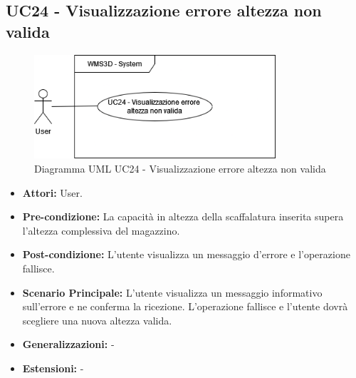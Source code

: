 \subsection{UC24 - Visualizzazione errore altezza non valida}
\begin{figure}[H]
  \centering
  \includegraphics[width=0.8\textwidth]{UC_diagrams_21-26/UC24.drawio.png}
   \caption{Diagramma UML UC24 - Visualizzazione errore altezza non valida}
\end{figure}
\begin{itemize}
    \item \textbf{Attori:} User.
    \item \textbf{Pre-condizione:}  La capacità in altezza della scaffalatura inserita supera l'altezza complessiva del magazzino.
    \item \textbf{Post-condizione:} L'utente visualizza un messaggio d'errore e l'operazione fallisce.
    \item \textbf{Scenario Principale:}  L'utente visualizza un messaggio informativo sull'errore e ne conferma la ricezione. L'operazione fallisce e l'utente dovrà scegliere una nuova altezza valida.
    \item \textbf{Generalizzazioni:} -
    \item \textbf{Estensioni:} -
\end{itemize}